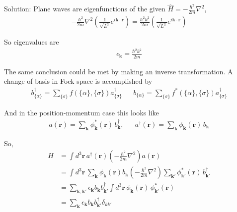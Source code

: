 \begin{homeworkProblem}
\begin{itemize}
\begin{callout}{Solution:}
                Plane waves are eigenfunctions of the given $\hat{H}= - \frac{\hbar^2}{2m}\nabla^2$,
                \begin{align*}
                    - \frac{\hbar^{2}}{2m}\nabla^{2} \left( \frac{1}{\sqrt{L^{3}}} e^{i \mathbf{k} \cdot \mathbf{r}}  \right) = \frac{\hbar^{2} k^{2}}{2m} \left( \frac{1}{\sqrt{L^{3}}} e^{i \mathbf{k}\cdot \mathbf{r}}  \right)
                \end{align*}

                So eigenvalues are 
                \begin{align*}
                    \epsilon_{\mathbf{k}} = \frac{\hbar^{2} k^{2}}{2m}
                \end{align*}

                The same conclusion could be met by making an inverse transformation. A change of basis in Fock space is accomplished by 
                \begin{align*}
                    b^{\dagger}_{\{\alpha\}}= \sum_{\{\sigma\}} f(\{\alpha\}, \{\sigma\}) a^{\dagger}_{\{\sigma\}}
                     &&b_{\{\alpha\}}= \sum_{\{\sigma\}} f^{*}(\{\alpha\}, \{\sigma\}) a^{\dagger}_{\{\sigma\}}
                \end{align*}

                And in the position-momentum case this looks like
                \begin{align*}
                    a(\mathbf r) = \sum_{\mathbf k} \phi_{\mathbf k}^*(\mathbf r)\, b_{\mathbf k}^\dagger, 
                    &&a^\dagger(\mathbf r) = \sum_{\mathbf k} \phi_{\mathbf k}(\mathbf r)\, b_{\mathbf k}
                \end{align*}

                So,
                \begin{align*}
                    H &= \int d^3 \mathbf{r}\, a^{\dagger}(\mathbf{r})\left(-\frac{\hbar^2}{2 m} \nabla^2\right) a(\mathbf{r})\\
                      &= \int d^3 \mathbf{r}\, \sum_{\mathbf k} \phi_{\mathbf k}(\mathbf r) b_{\mathbf k}
                    \left(-\frac{\hbar^2}{2 m} \nabla^2\right) 
                    \sum_{\mathbf k'} \phi_{\mathbf k'}^*(\mathbf r)\, b_{\mathbf k'}^{\dagger} \\
                      &= \sum_{\mathbf k, \mathbf k'} \epsilon_{\mathbf k} b_{\mathbf k}b_{\mathbf k'}^\dagger 
                    \int d^3 \mathbf{r}\, \phi_{\mathbf k}(\mathbf r)\, \phi_{\mathbf k'}^*(\mathbf r) \\
                      &= \sum_{\mathbf k} \epsilon_{\mathbf k} b_{\mathbf k}b_{\mathbf k'}^\dagger \delta_{kk'} 
                \end{align*}


\end{callout}
\end{itemize}
\end{homeworkProblem}
